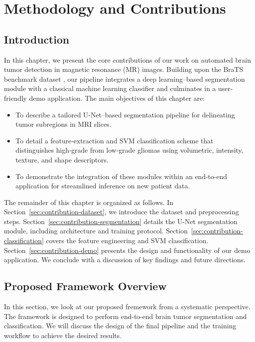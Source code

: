 \chapter{Methodology and Contributions}

\section{Introduction}
\label{sec:contribution-introduction}

In this chapter, we present the core contributions of our work on automated brain tumor detection in magnetic resonance (MR) images. Building upon the BraTS benchmark dataset \cite{Menze2015}, our pipeline integrates a deep learning–based segmentation module with a classical machine learning classifier and culminates in a user‐friendly demo application. The main objectives of this chapter are:
\begin{itemize}
  \item To describe a tailored U-Net–based segmentation pipeline for delineating tumor subregions in MRI slices.
  \item To detail a feature‐extraction and SVM classification scheme that distinguishes high‐grade from low‐grade gliomas using volumetric, intensity, texture, and shape descriptors.
  \item To demonstrate the integration of these modules within an end-to-end application for streamlined inference on new patient data.
\end{itemize}

The remainder of this chapter is organized as follows. In Section~\ref{sec:contribution-dataset}, we introduce the dataset and preprocessing steps. Section~\ref{sec:contribution-segmentation} details the U-Net segmentation module, including architecture and training protocol. Section~\ref{sec:contribution-classification} covers the feature engineering and SVM classification. Section~\ref{sec:contribution-demo} presents the design and functionality of our demo application. We conclude with a discussion of key findings and future directions.

\section{Proposed Framework Overview}
\label{sec:contribution-framework}
In this section, we look at our proposed fremework from a systematic perspective. The framework is designed to perform end-to-end brain tumor segmentation and classification. We will discuss the design of the final pipeline and the training workflow to achieve the desired results.

